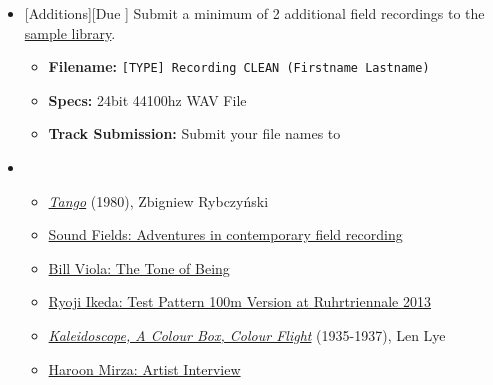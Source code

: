 \begin{itemize}[noitemsep,topsep=0pt,leftmargin=*]
	\item {}[Additions][Due \dSun] \newline
	      Submit a minimum of 2 additional field recordings to the \href{\samplelibPermURL}{sample library}.
	      \begin{itemize}
		      \item \textbf{Filename:} \texttt{[TYPE] Recording CLEAN (Firstname Lastname)}
		      \item \textbf{Specs:} 24bit 44100hz WAV File
		      \item \textbf{Track Submission:} Submit your file names to \discordS
	      \end{itemize}
	\item {}
	      \begin{itemize}
		      \item \href{https://www.youtube.com/watch?v=u0pEpA_Y1a4}{\emph{Tango}} (1980), Zbigniew Rybczyński
		      \item \href{https://www.youtube.com/watch?v=esfUwg1-xrI}{Sound Fields: Adventures in contemporary field recording}
		      \item \href{https://vimeo.com/64302190}{Bill Viola: The Tone of Being}
		      \item \href{https://www.youtube.com/watch?v=XwjlYpJCBgk}{Ryoji Ikeda: Test Pattern 100m Version at Ruhrtriennale 2013}
		      \item \href{https://www.youtube.com/watch?v=-DksmbDMDUU}{\emph{Kaleidoscope, A Colour Box, Colour Flight}} (1935-1937), Len Lye
		      \item \href{https://www.youtube.com/watch?v=Y8Zpr1ESEO4}{Haroon Mirza: Artist Interview}
	      \end{itemize}
\end{itemize}